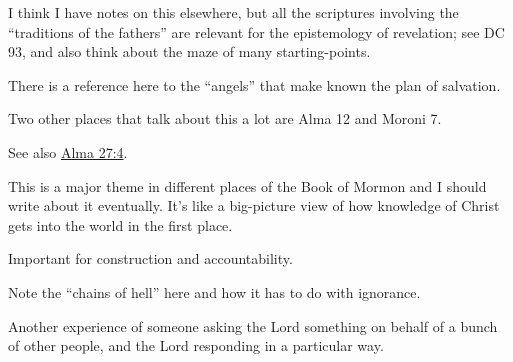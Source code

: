 \begin{compactdesc}
			\item[{\hyperref[ALMA-24-7]{Alma 24:7--9}}] \phantom{.}
				\begin{compactitem}
					\item I think I have notes on this elsewhere, but all the scriptures involving the ``traditions of the fathers'' are relevant for the epistemology of revelation; see DC 93, and also think about the maze of many starting-points.
				\end{compactitem}
			\item[{\hyperref[ALMA-24-14]{Alma 24:14}}] \phantom{.}
				\begin{compactitem}
					\item There is a reference here to the ``angels'' that make known the plan of salvation.
					\item Two other places that talk about this a lot are Alma 12 and Moroni 7.
					\item See also \hyperref[ALMA-27-4]{Alma 27:4}.
					\item This is a major theme in different places of the Book of Mormon and I should write about it eventually. It's like a big-picture view of how knowledge of Christ gets into the world in the first place.
				\end{compactitem}
			\item[{\hyperref[ALMA-24-29]{Alma 24:29--30}}]
			\item[{\hyperref[ALMA-25-15]{Alma 25:15--16}}] \phantom{.}
				\begin{compactitem}
					\item Important for construction and accountability.
				\end{compactitem}
			\item[{\hyperref[ALMA-26-14]{Alma 26:14--15}}] \phantom{.}
				\begin{compactitem}
					\item Note the ``chains of hell'' here and how it has to do with ignorance.
				\end{compactitem}
			\item[{\hyperref[ALMA-26-21]{Alma 26:21--22}}]
			\item[{\hyperref[ALMA-27-7]{Alma 27:7--13}}] \phantom{.}
				\begin{compactitem}
					\item Another experience of someone asking the Lord something on behalf of a bunch of other people, and the Lord responding in a particular way.
				\end{compactitem}
			\item[{\hyperref[ALMA-28-12]{Alma 28:12}}]

\end{compactdesc}
